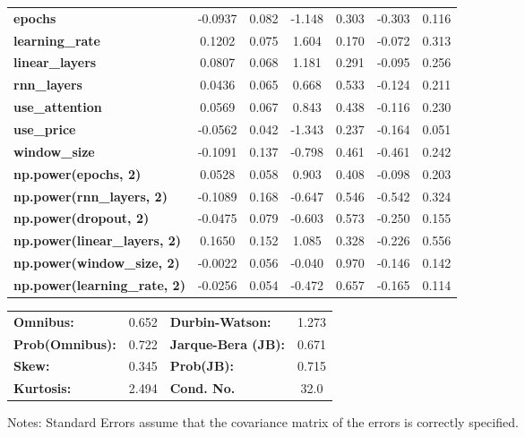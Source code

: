 \begin{center}
\begin{tabular}{lcccccc}
\textbf{epochs}                            &      -0.0937  &        0.082     &    -1.148  &         0.303        &       -0.303    &        0.116     \\
\textbf{learning\_rate}                    &       0.1202  &        0.075     &     1.604  &         0.170        &       -0.072    &        0.313     \\
\textbf{linear\_layers}                    &       0.0807  &        0.068     &     1.181  &         0.291        &       -0.095    &        0.256     \\
\textbf{rnn\_layers}                       &       0.0436  &        0.065     &     0.668  &         0.533        &       -0.124    &        0.211     \\
\textbf{use\_attention}                    &       0.0569  &        0.067     &     0.843  &         0.438        &       -0.116    &        0.230     \\
\textbf{use\_price}                        &      -0.0562  &        0.042     &    -1.343  &         0.237        &       -0.164    &        0.051     \\
\textbf{window\_size}                      &      -0.1091  &        0.137     &    -0.798  &         0.461        &       -0.461    &        0.242     \\
\textbf{np.power(epochs, 2)}               &       0.0528  &        0.058     &     0.903  &         0.408        &       -0.098    &        0.203     \\
\textbf{np.power(rnn\_layers, 2)}          &      -0.1089  &        0.168     &    -0.647  &         0.546        &       -0.542    &        0.324     \\
\textbf{np.power(dropout, 2)}              &      -0.0475  &        0.079     &    -0.603  &         0.573        &       -0.250    &        0.155     \\
\textbf{np.power(linear\_layers, 2)}       &       0.1650  &        0.152     &     1.085  &         0.328        &       -0.226    &        0.556     \\
\textbf{np.power(window\_size, 2)}         &      -0.0022  &        0.056     &    -0.040  &         0.970        &       -0.146    &        0.142     \\
\textbf{np.power(learning\_rate, 2)}       &      -0.0256  &        0.054     &    -0.472  &         0.657        &       -0.165    &        0.114     \\
\bottomrule
\end{tabular}
\begin{tabular}{lclc}
\textbf{Omnibus:}       &  0.652 & \textbf{  Durbin-Watson:     } &    1.273  \\
\textbf{Prob(Omnibus):} &  0.722 & \textbf{  Jarque-Bera (JB):  } &    0.671  \\
\textbf{Skew:}          &  0.345 & \textbf{  Prob(JB):          } &    0.715  \\
\textbf{Kurtosis:}      &  2.494 & \textbf{  Cond. No.          } &     32.0  \\
\bottomrule
\end{tabular}
\end{center}

Notes: \newline
 [1] Standard Errors assume that the covariance matrix of the errors is correctly specified.